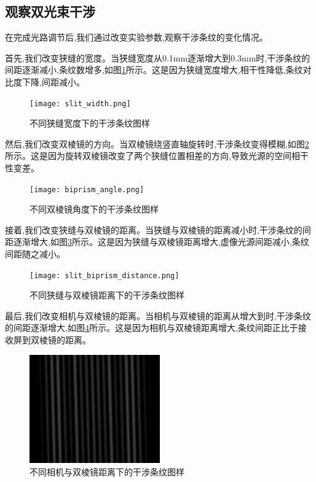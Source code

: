 \documentclass[UTF8]{ctexart}
\begin{document}
\subsection{观察双光束干涉}

在完成光路调节后,我们通过改变实验参数,观察干涉条纹的变化情况。

首先,我们改变狭缝的宽度。当狭缝宽度从0.1mm逐渐增大到0.3mm时,干涉条纹的间距逐渐减小,条纹数增多,如图\ref{fig:slit_width}所示。这是因为狭缝宽度增大,相干性降低,条纹对比度下降,间距减小。

\begin{figure}[htbp]
\centering
\texttt{[image: slit\_width.png]}
\caption{不同狭缝宽度下的干涉条纹图样}
\label{fig:slit_width}
\end{figure}

然后,我们改变双棱镜的方向。当双棱镜绕竖直轴旋转时,干涉条纹变得模糊,如图\ref{fig:biprism_angle}所示。这是因为旋转双棱镜改变了两个狭缝位置相差的方向,导致光源的空间相干性变差。

\begin{figure}[htbp]
\centering
\texttt{[image: biprism\_angle.png]}
\caption{不同双棱镜角度下的干涉条纹图样}
\label{fig:biprism_angle}
\end{figure}

接着,我们改变狭缝与双棱镜的距离。当狭缝与双棱镜的距离减小时,干涉条纹的间距逐渐增大,如图\ref{fig:slit_biprism_distance}所示。这是因为狭缝与双棱镜距离增大,虚像光源间距减小,条纹间距随之减小。

\begin{figure}[htbp]
\centering
\texttt{[image: slit\_biprism\_distance.png]}
\caption{不同狭缝与双棱镜距离下的干涉条纹图样}
\label{fig:slit_biprism_distance}
\end{figure}

最后,我们改变相机与双棱镜的距离。当相机与双棱镜的距离从增大到时,干涉条纹的间距逐渐增大,如图\ref{fig:camera_biprism_distance}所示。这是因为相机与双棱镜距离增大,条纹间距正比于接收屏到双棱镜的距离。

\begin{figure}[htbp]
\centering
\includegraphics[width=0.5\textwidth]{camera_biprism_distance.png}
\caption{不同相机与双棱镜距离下的干涉条纹图样}
\label{fig:camera_biprism_distance}
\end{figure}
\end{document}
